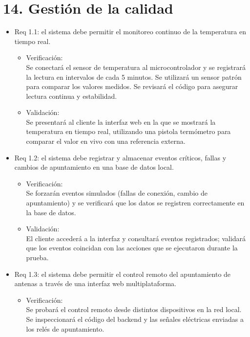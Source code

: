 \documentclass[
11pt, %
]{charter}
\begin{document}
\section{14. Gestión de la calidad}
\label{sec:calidad}

\begin{itemize} 

\item Req 1.1: el sistema debe permitir el monitoreo continuo de la temperatura en tiempo real.

\begin{itemize}
	\item Verificación: \\ Se conectará el sensor de temperatura al microcontrolador y se registrará la lectura en intervalos de cada 5 minutos. Se utilizará un sensor patrón para comparar los valores medidos. Se revisará el código para asegurar lectura continua y estabilidad.
	\item 	Validación: \\ Se presentará al cliente la interfaz web en la que se mostrará la temperatura en tiempo real, utilizando una pistola termómetro para comparar el valor en vivo con una referencia externa.
\end{itemize}

\item Req 1.2: el sistema debe registrar y almacenar eventos críticos, fallas y cambios de apuntamiento en una base de datos local.

\begin{itemize}
	\item Verificación: \\ Se forzarán eventos simulados (fallas de conexión, cambio de apuntamiento) y se verificará que los datos se registren correctamente en la base de datos.

	\item Validación: \\ El cliente accederá a la interfaz y consultará eventos registrados; validará que los eventos coincidan con las acciones que se ejecutaron durante la prueba.

\end{itemize}

\item Req 1.3: el sistema debe permitir el control remoto del apuntamiento de antenas a través de una interfaz web multiplataforma.

\begin{itemize}
	\item Verificación: \\ Se probará el control remoto desde distintos dispositivos en la red local. Se inspeccionará el código del backend y las señales eléctricas enviadas a los relés de apuntamiento.


\end{itemize}
\end{itemize}
\end{document}
